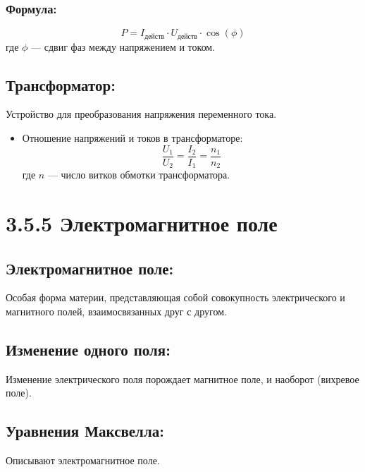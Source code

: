 \documentclass[a4paper,12pt]{article}
\begin{document}
\subsubsection*{Формула:}
\vspace{-0.05em}
$$ P = I_{\text{действ}} \cdot U_{\text{действ}} \cdot \cos(\phi) $$
где $\phi$ — сдвиг фаз между напряжением и током.


\vspace{-9pt}
\subsection*{Трансформатор:}
\vspace{-3pt}
Устройство для преобразования напряжения переменного тока.
\begin{itemize}
    \item Отношение напряжений и токов в трансформаторе:
    \vspace{-0.05em}
    $$ \frac{U_1}{U_2} = \frac{I_2}{I_1} = \frac{n_1}{n_2} $$
    где $n$ — число витков обмотки трансформатора.
\end{itemize}


\section*{3.5.5 Электромагнитное поле}
\vspace{-9pt}
\subsection*{Электромагнитное поле:}
\vspace{-3pt}
Особая форма материи, представляющая собой совокупность электрического и магнитного полей, взаимосвязанных друг с другом.

\vspace{-9pt}
\subsection*{Изменение одного поля:}
\vspace{-3pt}
Изменение электрического поля порождает магнитное поле, и наоборот (вихревое поле).

\vspace{-9pt}
\subsection*{Уравнения Максвелла:}
\vspace{-3pt}
Описывают электромагнитное поле.
\end{document}
